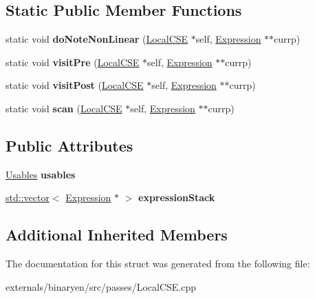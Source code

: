 \subsection*{Static Public Member Functions}
\begin{DoxyCompactItemize}
\item 
\mbox{\label{structwasm_1_1_local_c_s_e_ae14d96d2b0d1864a94c95141521c490d}} 
static void {\bfseries do\+Note\+Non\+Linear} (\mbox{\hyperlink{structwasm_1_1_local_c_s_e}{Local\+C\+SE}} $\ast$self, \mbox{\hyperlink{classwasm_1_1_expression}{Expression}} $\ast$$\ast$currp)
\item 
\mbox{\label{structwasm_1_1_local_c_s_e_a3de6825cf28c62baab918ebd0993916d}} 
static void {\bfseries visit\+Pre} (\mbox{\hyperlink{structwasm_1_1_local_c_s_e}{Local\+C\+SE}} $\ast$self, \mbox{\hyperlink{classwasm_1_1_expression}{Expression}} $\ast$$\ast$currp)
\item 
\mbox{\label{structwasm_1_1_local_c_s_e_a13c6812101faca7a3dd3a9c0640225ad}} 
static void {\bfseries visit\+Post} (\mbox{\hyperlink{structwasm_1_1_local_c_s_e}{Local\+C\+SE}} $\ast$self, \mbox{\hyperlink{classwasm_1_1_expression}{Expression}} $\ast$$\ast$currp)
\item 
\mbox{\label{structwasm_1_1_local_c_s_e_a2420cfc47b08f620cbe7e2de1308b8b0}} 
static void {\bfseries scan} (\mbox{\hyperlink{structwasm_1_1_local_c_s_e}{Local\+C\+SE}} $\ast$self, \mbox{\hyperlink{classwasm_1_1_expression}{Expression}} $\ast$$\ast$currp)
\end{DoxyCompactItemize}
\subsection*{Public Attributes}
\begin{DoxyCompactItemize}
\item 
\mbox{\label{structwasm_1_1_local_c_s_e_ad7d0ff91f5c7ef8bf1712b8dea201d2b}} 
\mbox{\hyperlink{classwasm_1_1_hashed_expression_map}{Usables}} {\bfseries usables}
\item 
\mbox{\label{structwasm_1_1_local_c_s_e_a8d27e22e89a4fff14338f4e31e3e2fc1}} 
\mbox{\hyperlink{classstd_1_1vector}{std\+::vector}}$<$ \mbox{\hyperlink{classwasm_1_1_expression}{Expression}} $\ast$ $>$ {\bfseries expression\+Stack}
\end{DoxyCompactItemize}
\subsection*{Additional Inherited Members}


The documentation for this struct was generated from the following file\+:\begin{DoxyCompactItemize}
\item 
externals/binaryen/src/passes/Local\+C\+S\+E.\+cpp\end{DoxyCompactItemize}
